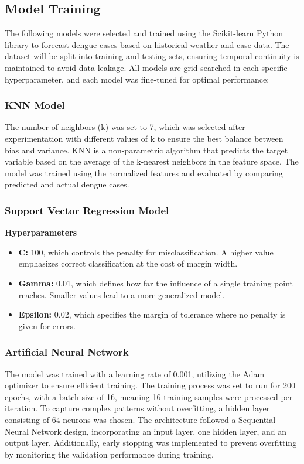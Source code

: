 \documentclass{article}
\begin{document}
\subsection{Model Training}
The following models were selected and trained using the Scikit-learn Python library to forecast dengue cases based on historical weather and case data. The dataset will be split into training and testing sets, ensuring temporal continuity is maintained to avoid data leakage. All models are grid-searched in each specific hyperparameter, and each model was fine-tuned for optimal performance:

\subsubsection{KNN Model}
The number of neighbors (k) was set to 7, which was selected after experimentation with different values of k to ensure the best balance between bias and variance. KNN is a non-parametric algorithm that predicts the target variable based on the average of the k-nearest neighbors in the feature space. The model was trained using the normalized features and evaluated by comparing predicted and actual dengue cases.

\subsubsection{Support Vector Regression Model}
\textbf{Hyperparameters}
\begin{itemize}
    \item \textbf{C:} 100, which controls the penalty for misclassification. A higher value emphasizes correct classification at the cost of margin width.
    \item \textbf{Gamma:} 0.01, which defines how far the influence of a single training point reaches. Smaller values lead to a more generalized model.
    \item \textbf{Epsilon:} 0.02, which specifies the margin of tolerance where no penalty is given for errors.
\end{itemize}

\subsubsection{Artificial Neural Network}
The model was trained with a learning rate of 0.001, utilizing the Adam optimizer to ensure efficient training. The training process was set to run for 200 epochs, with a batch size of 16, meaning 16 training samples were processed per iteration. To capture complex patterns without overfitting, a hidden layer consisting of 64 neurons was chosen. The architecture followed a Sequential Neural Network design, incorporating an input layer, one hidden layer, and an output layer. Additionally, early stopping was implemented to prevent overfitting by monitoring the validation performance during training.
\end{document}
